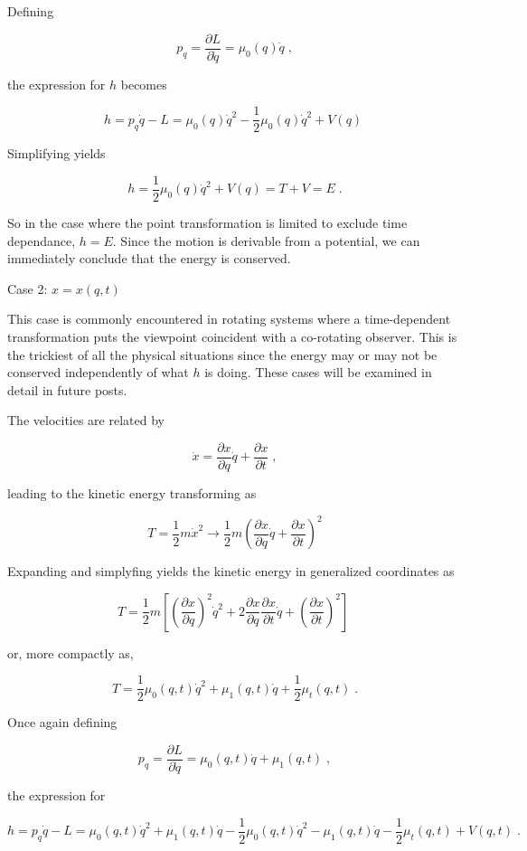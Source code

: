 \documentclass[12pt]{article}
\begin{document}
Defining 

\[ p_q = \frac{\partial L}{\partial {\dot q}} = \mu_0(q) {\dot q} \; , \]

the expression for $h$ becomes

\[ h = p_q {\dot q} - L = \mu_0(q) {\dot q}^2 - \frac{1}{2} \mu_0(q) {\dot q}^2 + V(q) \; \]

Simplifying yields

\[ h = \frac{1}{2} \mu_0(q) {\dot q}^2 + V(q) = T + V = E \; . \]

So in the case where the point transformation is limited to exclude time dependance, $h = E$.  Since the motion is derivable from a potential, we can immediately conclude that the energy is conserved.

Case 2: $ x = x(q,t)$

This case is commonly encountered in rotating systems where a time-dependent transformation puts the viewpoint coincident with a co-rotating observer.  This is the trickiest of all the physical situations since the energy may or may not be conserved independently of what $h$ is doing.  These cases will be examined in detail in future posts.

The velocities are related by
 
\[ {\dot x} =  \frac{\partial x}{\partial q} {\dot q} + \frac{\partial x}{\partial t} \; , \]

leading to the kinetic energy transforming as

\[ T =  \frac{1}{2} m {\dot x}^2 \rightarrow \frac{1}{2} m \left( \frac{\partial x}{\partial q} {\dot q} + \frac{\partial x}{\partial t} \right)^2 \]

Expanding and simplyfing yields the kinetic energy in generalized coordinates as 

\[ T = \frac{1}{2} m \left[ \left(\frac{\partial x}{\partial q}\right)^2 {\dot q}^2 + 2 \frac{\partial x}{\partial q} \frac{\partial x}{\partial t} {\dot q} + \left(\frac{\partial x}{\partial t} \right)^2 \right] \;  \]

or, more compactly as,

\[ T = \frac{1}{2} \mu_0(q,t) {\dot q}^2 + \mu_1(q,t) {\dot q} + \frac{1}{2} \mu_t(q,t) \; .\]

Once again defining 

\[ p_q = \frac{\partial L}{\partial {\dot q}} = \mu_0(q,t) {\dot q} + \mu_1(q,t) \; , \]

the expression for 

\[ h = p_q {\dot q} - L = \mu_0(q,t) {\dot q}^2 + \mu_1(q,t) {\dot q} - \frac{1}{2} \mu_0(q,t){\dot q}^2 - \mu_1(q,t) {\dot q} - \frac{1}{2} \mu_t(q,t) + V(q,t) \; . \]
\end{document}

